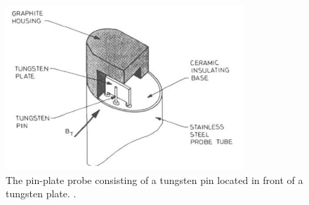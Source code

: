 \begin{figure}[H]
	\centering
	\includegraphics[width=0.8\textwidth]{pin_plate_probe.png}
	\caption{The pin-plate probe consisting of a tungsten pin located in front of a tungsten plate.  \cite{pin-plate-stangeby}.}
	\label{fig:pin_plate_probe}
\end{figure}



